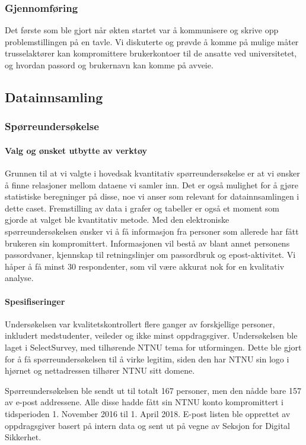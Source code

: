 \subsubsection{Gjennomføring}
Det første som ble gjort når økten startet var å kommunisere og skrive opp problemstillingen på en tavle. Vi diskuterte og prøvde å komme på mulige måter trusselaktører kan kompromittere brukerkontoer til de ansatte ved universitetet, og hvordan passord og brukernavn kan komme på avveie.


\subsection{Datainnsamling}

\subsubsection{Spørreundersøkelse}

\paragraph{Valg og ønsket utbytte av verktøy}
Grunnen til at vi valgte i hovedsak kvantitativ spørreundersøkelse er at vi ønsker å finne relasjoner mellom dataene vi samler inn. Det er også mulighet for å gjøre statistiske beregninger på disse, noe vi anser som relevant for datainnsamlingen i dette caset. Fremstilling av data i grafer og tabeller er også et moment som gjorde at valget ble kvantitativ metode. Med den elektroniske spørreundersøkelsen ønsker vi å få informasjon fra personer som allerede har fått brukeren sin kompromittert. Informasjonen vil bestå av blant annet personens passordvaner, kjennskap til retningslinjer om passordbruk og epost-aktivitet. Vi håper å få minst 30 respondenter, som vil være akkurat nok for en kvalitativ analyse. 

\paragraph{Spesifiseringer}
Undersøkelsen var kvalitetskontrollert flere ganger av forskjellige personer, inkludert medstudenter, veileder og ikke minst oppdragsgiver. Undersøkelsen ble laget i SelectSurvey, med tilhørende NTNU tema for utformingen. Dette ble gjort for å få spørreundersøkelsen til å virke legitim, siden den har NTNU sin logo i hjørnet og nettadressen tilhører NTNU sitt domene. 

Spørreundersøkelsen ble sendt ut til totalt 167 personer, men den nådde bare 157 av e-post addressene. Alle disse hadde fått sin NTNU konto kompromittert i tidsperioden 1. November 2016 til 1. April 2018. E-post listen ble opprettet av oppdragsgiver basert på intern data og sent ut på vegne av Seksjon for Digital Sikkerhet. 

